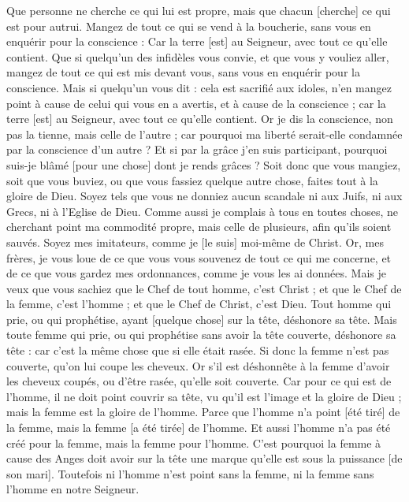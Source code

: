 \begin{multicols}{2}
Que personne ne cherche ce qui lui est propre, mais que chacun [cherche] ce qui est pour autrui.
Mangez de tout ce qui se vend à la boucherie, sans vous en enquérir pour la conscience :
Car la terre [est] au Seigneur, avec tout ce qu'elle contient.
Que si quelqu'un des infidèles vous convie, et que vous y vouliez aller, mangez de tout ce qui est mis devant vous, sans vous en enquérir pour la conscience.
Mais si quelqu'un vous dit : cela est sacrifié aux idoles, n'en mangez point à cause de celui qui vous en a avertis, et à cause de la conscience ; car la terre [est] au Seigneur, avec tout ce qu'elle contient.
Or je dis la conscience, non pas la tienne, mais celle de l'autre ; car pourquoi ma liberté serait-elle condamnée par la conscience d'un autre ?
Et si par la grâce j'en suis participant, pourquoi suis-je blâmé [pour une chose] dont je rends grâces ?
Soit donc que vous mangiez, soit que vous buviez, ou que vous fassiez quelque autre chose, faites tout à la gloire de Dieu.
Soyez tels que vous ne donniez aucun scandale ni aux Juifs, ni aux Grecs, ni à l'Eglise de Dieu.
Comme aussi je complais à tous en toutes choses, ne cherchant point ma commodité propre, mais celle de plusieurs, afin qu'ils soient sauvés.
\VerseOne{}Soyez mes imitateurs, comme je [le suis] moi-même de Christ.
Or, mes frères, je vous loue de ce que vous vous souvenez de tout ce qui me concerne, et de ce que vous gardez mes ordonnances, comme je vous les ai données.
Mais je veux que vous sachiez que le Chef de tout homme, c'est Christ ; et que le Chef de la femme, c'est l'homme ; et que le Chef de Christ, c'est Dieu.
Tout homme qui prie, ou qui prophétise, ayant [quelque chose] sur la tête, déshonore sa tête.
Mais toute femme qui prie, ou qui prophétise sans avoir la tête couverte, déshonore sa tête : car c'est la même chose que si elle était rasée.
Si donc la femme n'est pas couverte, qu'on lui coupe les cheveux. Or s'il est déshonnête à la femme d'avoir les cheveux coupés, ou d'être rasée, qu'elle soit couverte.
Car pour ce qui est de l'homme, il ne doit point couvrir sa tête, vu qu'il est l'image et la gloire de Dieu ; mais la femme est la gloire de l'homme.
Parce que l'homme n'a point [été tiré] de la femme, mais la femme [a été tirée] de l'homme.
Et aussi l'homme n'a pas été créé pour la femme, mais la femme pour l'homme.
C'est pourquoi la femme à cause des Anges doit avoir sur la tête une marque qu'elle est sous la puissance [de son mari].
Toutefois ni l'homme n'est point sans la femme, ni la femme sans l'homme en notre Seigneur.

\end{multicols}
